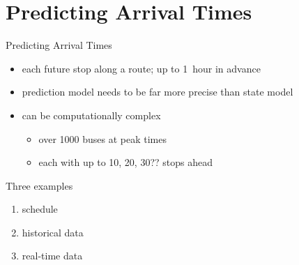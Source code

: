 \documentclass[10pt,t]{beamer}
\begin{document}
{ %
    \begin{frame}[plain]
     \end{frame}
}



\section{Predicting Arrival Times}

\begin{frame}{Predicting Arrival Times}
  \begin{itemize}
  \item each future stop along a route; up to 1~hour in advance
  \item prediction model needs to be far more precise than state model
  \item can be computationally complex
    \begin{itemize}
    \item over 1000 buses at peak times
    \item each with up to 10, 20, 30?? stops ahead
    \end{itemize}
  \end{itemize}

  \begin{exampleblock}{Three examples}
    \begin{enumerate}
    \item schedule
      
    \item historical data
      
    \item real-time data
    \end{enumerate}
  \end{exampleblock}
\end{frame}
\end{document}
